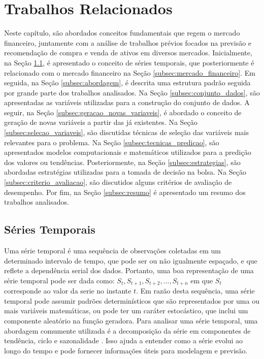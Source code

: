 \chapter{Trabalhos Relacionados}
\label{cap:trabalhos_relacionados}

Neste capítulo, são abordados conceitos fundamentais que regem o mercado financeiro, juntamente com a análise de trabalhos prévios focados na previsão e recomendação de compra e venda de ativos em diversos mercados. Inicialmente, na Seção \ref{subsec:series_temporais}, é apresentado o conceito de séries temporais, que posteriormente é relacionado com o mercado financeiro na Seção \ref{subsec:mercado_financeiro}. Em seguida, na Seção \ref{subsec:abordagem}, é descrita uma estrutura padrão seguida por grande parte dos trabalhos analisados. Na Seção \ref{subsec:conjunto_dados}, são apresentadas as variáveis utilizadas para a construção do conjunto de dados. A seguir, na Seção \ref{subsec:geracao_novas_variaveis}, é abordado o conceito de geração de novas variáveis a partir das já existentes. Na Seção \ref{subsec:selecao_variaveis}, são discutidas técnicas de seleção das variáveis mais relevantes para o problema. Na Seção \ref{subsec:tecnicas_predicao}, são apresentados modelos computacionais e matemáticos utilizados para a predição dos valores ou tendências. Posteriormente, na Seção \ref{subsec:estrategias}, são abordadas estratégias utilizadas para a tomada de decisão na bolsa. Na Seção \ref{subsec:criterio_avaliacao}, são discutidos alguns critérios de avaliação de desempenho. Por fim, na Seção \ref{subsec:resumo} é apresentado um resumo dos trabalhos analisados. 

\section{Séries Temporais}
\label{subsec:series_temporais}
Uma série temporal é uma sequência de observações coletadas em um determinado intervalo de tempo, que pode ser ou não igualmente espaçado, e que reflete a dependência serial dos dados. Portanto, uma boa representação de uma série temporal pode ser dada como: $S_t, S_{t+1}, S_{t+2}, ..., S_{t+n}$ em que $S_t$ corresponde ao valor da serie no instante $t$. Em razão desta sequência, uma série temporal pode assumir padrões determinísticos que são representados por uma ou mais variáveis matemáticas, ou pode ter um caráter estocástico, que inclui um componente aleatório na função geradora. Para analisar uma série temporal, uma abordagem comumente utilizada é a decomposição da série em componentes de tendência, ciclo e sazonalidade \cite{Morettin_Modelling}. Isso ajuda a entender como a série evolui ao longo do tempo e pode fornecer informações úteis para modelagem e previsão.

